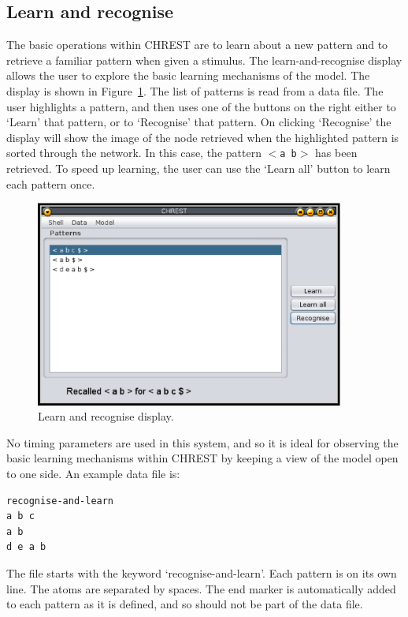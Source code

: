 \documentclass{article}
\begin{document}
\subsection{Learn and recognise}

The basic operations within CHREST are to learn about a new pattern and to
retrieve a familiar pattern when given a stimulus.  The learn-and-recognise
display allows the user to explore the basic learning mechanisms of the model.
The display is shown in Figure~\ref{learn-and-recognise}.  The list of patterns
is read from a data file.  The user highlights a pattern, and then uses one of
the buttons on the right either to `Learn' that pattern, or to `Recognise' that
pattern.  On clicking `Recognise' the display will show the image of the node
retrieved when the highlighted pattern is sorted through the network.  In this
case, the pattern {\tt $<$a b$>$} has been retrieved.  To speed up learning,
the user can use the `Learn all' button to learn each pattern once.  

\begin{figure}
\includegraphics[width=4.0in]{images/learn-and-recognise.eps}
\caption{Learn and recognise display.}
\label{learn-and-recognise}
\end{figure}

No timing parameters are used in this system, and so it is ideal for observing
the basic learning mechanisms within CHREST by keeping a view of the model open
to one side.  An example data file is: 

\begin{verbatim}
recognise-and-learn 
a b c 
a b 
d e a b
\end{verbatim}

The file starts with the keyword `recognise-and-learn'.  Each pattern is on its
own line.  The atoms are separated by spaces.  The end marker is automatically
added to each pattern as it is defined, and so should not be part of the data
file.
\end{document}
